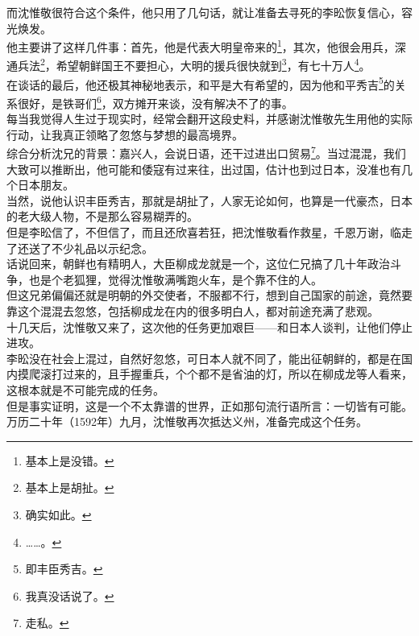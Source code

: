 \begin{multicols}{\theparacolNo}
而沈惟敬很符合这个条件，他只用了几句话，就让准备去寻死的李昖恢复信心，容光焕发。\\

他主要讲了这样几件事：首先，他是代表大明皇帝来的\footnote{基本上是没错。}，其次，他很会用兵，深通兵法\footnote{基本上是胡扯。}，希望朝鲜国王不要担心，大明的援兵很快就到\footnote{确实如此。}，有七十万人\footnote{……。}。\\

在谈话的最后，他还极其神秘地表示，和平是大有希望的，因为他和平秀吉\footnote{即丰臣秀吉。}的关系很好，是铁哥们\footnote{我真没话说了。}，双方摊开来谈，没有解决不了的事。\\

每当我觉得人生过于现实时，经常会翻开这段史料，并感谢沈惟敬先生用他的实际行动，让我真正领略了忽悠与梦想的最高境界。\\

综合分析沈兄的背景：嘉兴人，会说日语，还干过进出口贸易\footnote{走私。}。当过混混，我们大致可以推断出，他可能和倭寇有过来往，出过国，估计也到过日本，没准也有几个日本朋友。\\

当然，说他认识丰臣秀吉，那就是胡扯了，人家无论如何，也算是一代豪杰，日本的老大级人物，不是那么容易糊弄的。\\

但是李昖信了，不但信了，而且还欣喜若狂，把沈惟敬看作救星，千恩万谢，临走了还送了不少礼品以示纪念。\\

话说回来，朝鲜也有精明人，大臣柳成龙就是一个，这位仁兄搞了几十年政治斗争，也是个老狐狸，觉得沈惟敬满嘴跑火车，是个靠不住的人。\\

但这兄弟偏偏还就是明朝的外交使者，不服都不行，想到自己国家的前途，竟然要靠这个混混去忽悠，包括柳成龙在内的很多明白人，都对前途充满了悲观。\\

十几天后，沈惟敬又来了，这次他的任务更加艰巨——和日本人谈判，让他们停止进攻。\\

李昖没在社会上混过，自然好忽悠，可日本人就不同了，能出征朝鲜的，都是在国内摸爬滚打过来的，且手握重兵，个个都不是省油的灯，所以在柳成龙等人看来，这根本就是不可能完成的任务。\\

但是事实证明，这是一个不太靠谱的世界，正如那句流行语所言：一切皆有可能。\\

万历二十年（1592年）九月，沈惟敬再次抵达义州，准备完成这个任务。\\


\end{multicols}
